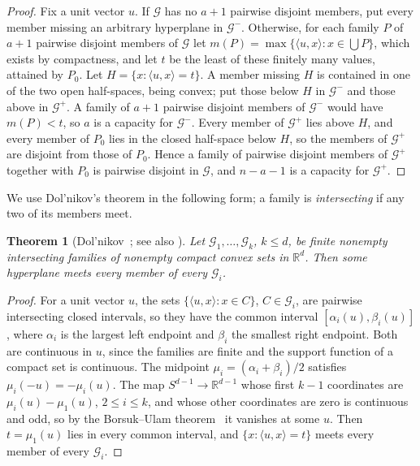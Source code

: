 \documentclass[11pt]{amsart}
\newtheorem{theorem}{Theorem}[section]
\theoremstyle{remark}
\newcommand{\R}{\mathbb R}
\newcommand{\G}{\mathcal G}
\begin{document}
\begin{proof}
Fix a unit vector $u$. If $\G$ has no $a+1$ pairwise disjoint members, put every member missing an arbitrary
hyperplane in $\G^-$. Otherwise, for each family $P$ of $a+1$ pairwise disjoint members of $\G$ let
$m(P)=\max\{\langle u,x\rangle: x\in\bigcup P\}$, which exists by compactness, and let $t$ be the least of these finitely
many values, attained by $P_0$. Let $H=\{x:\langle u,x\rangle=t\}$. A member missing $H$ is contained in one of the two
open half-spaces, being convex; put those below $H$ in $\G^-$ and those above in $\G^+$. A family of $a+1$ pairwise
disjoint members of $\G^-$ would have $m(P)<t$, so $a$ is a capacity for $\G^-$. Every member of $\G^+$ lies above $H$,
and every member of $P_0$ lies in the closed half-space below $H$, so the members of $\G^+$ are disjoint from those of
$P_0$. Hence a family of pairwise disjoint members of $\G^+$ together with $P_0$ is pairwise disjoint in $\G$, and
$n-a-1$ is a capacity for $\G^+$.
\end{proof}

We use Dol'nikov's theorem in the following form; a family is \emph{intersecting} if any two of its members meet.

\begin{theorem}[Dol'nikov~\cite{Dol92}; see also {\cite[Theorem~1.2]{FMSS24}}]\label{thm:dol}
Let $\G_1,\dots,\G_k$, $k\le d$, be finite nonempty intersecting families of nonempty compact convex sets in $\R^d$. Then some
hyperplane meets every member of every $\G_i$.
\end{theorem}

\begin{proof}
For a unit vector $u$, the sets $\{\langle u,x\rangle:x\in C\}$, $C\in\G_i$, are pairwise intersecting closed
intervals, so they have the common interval $[\alpha_i(u),\beta_i(u)]$, where $\alpha_i$ is the largest left endpoint and
$\beta_i$ the smallest right endpoint. Both are continuous in $u$, since the families are finite and the support
function of a compact set is continuous. The midpoint $\mu_i=(\alpha_i+\beta_i)/2$ satisfies $\mu_i(-u)=-\mu_i(u)$.
The map $S^{d-1}\to\R^{d-1}$ whose first $k-1$ coordinates are $\mu_i(u)-\mu_1(u)$, $2\le i\le k$, and whose other
coordinates are zero is continuous and odd, so by the Borsuk--Ulam theorem~\cite{Bor33} it vanishes at some $u$. Then
$t=\mu_1(u)$ lies in every common interval, and $\{x:\langle u,x\rangle=t\}$ meets every member of every $\G_i$.
\end{proof}
\end{document}
